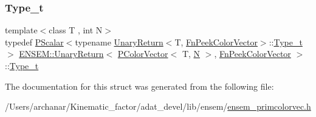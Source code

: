 \subsubsection{\texorpdfstring{Type\_t}{Type\_t}\hspace{0.1cm}{\footnotesize\ttfamily [2/2]}}
{\footnotesize\ttfamily template$<$class T , int N$>$ \\
typedef \mbox{\hyperlink{classENSEM_1_1PScalar}{P\+Scalar}}$<$typename \mbox{\hyperlink{structENSEM_1_1UnaryReturn}{Unary\+Return}}$<$T, \mbox{\hyperlink{structENSEM_1_1FnPeekColorVector}{Fn\+Peek\+Color\+Vector}}$>$\+::\mbox{\hyperlink{structENSEM_1_1UnaryReturn_3_01PColorVector_3_01T_00_01N_01_4_00_01FnPeekColorVector_01_4_a827d146f0d51b63a38339bc9218d64d4}{Type\+\_\+t}}$>$ \mbox{\hyperlink{structENSEM_1_1UnaryReturn}{E\+N\+S\+E\+M\+::\+Unary\+Return}}$<$ \mbox{\hyperlink{classENSEM_1_1PColorVector}{P\+Color\+Vector}}$<$ T, \mbox{\hyperlink{operator__name__util_8cc_a7722c8ecbb62d99aee7ce68b1752f337}{N}} $>$, \mbox{\hyperlink{structENSEM_1_1FnPeekColorVector}{Fn\+Peek\+Color\+Vector}} $>$\+::\mbox{\hyperlink{structENSEM_1_1UnaryReturn_3_01PColorVector_3_01T_00_01N_01_4_00_01FnPeekColorVector_01_4_a827d146f0d51b63a38339bc9218d64d4}{Type\+\_\+t}}}



The documentation for this struct was generated from the following file\+:\begin{DoxyCompactItemize}
\item 
/\+Users/archanar/\+Kinematic\+\_\+factor/adat\+\_\+devel/lib/ensem/\mbox{\hyperlink{lib_2ensem_2ensem__primcolorvec_8h}{ensem\+\_\+primcolorvec.\+h}}\end{DoxyCompactItemize}
